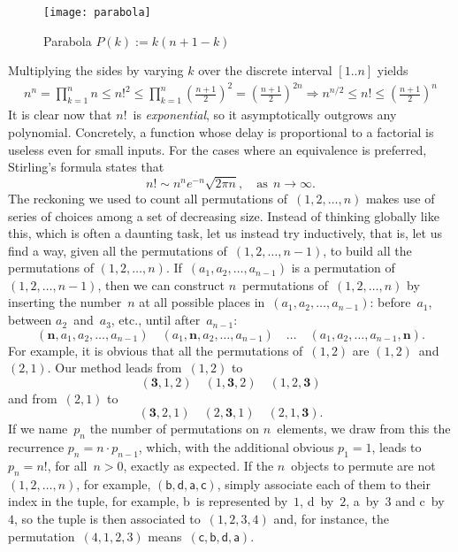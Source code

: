 \begin{figure}[H]
\centering
\texttt{[image: parabola]}
\caption{Parabola \(P(k) := k(n+1-k)\)\label{fig:parabola}}
\end{figure}
\noindent Multiplying the sides by varying \(k\) over the discrete
interval \([1..n]\) yields
\begin{gather*}
n^n = \prod_{k=1}^{n}{n} \leqslant n!^2 
\leqslant
\prod_{k=1}^{n}{\left(\!\frac{n+1}{2}\!\right)^2} \!\!=
\left(\!\frac{n+1}{2}\!\right)^{2n}
\!\!\!\Rightarrow\!
n^{n/2} \leqslant n! \leqslant \left(\!\frac{n+1}{2}\!\right)^n
\end{gather*}
It is clear now that \(n!\)~is \emph{exponential}, so it
asymptotically outgrows any polynomial. Concretely, a function whose
delay is proportional to a factorial is useless even for small
inputs. For the cases where an equivalence is preferred, Stirling's
formula states that
\begin{equation*}
n! \mathrel{\sim} n^n e^{-n} \sqrt{2\pi n},\quad \text{as} \,\; n
\rightarrow \infty.
\end{equation*}
The reckoning we used to count all permutations of~\((1,2,\dots,n)\)
makes use of series of choices among a set of decreasing size. Instead
of thinking globally like this, which is often a daunting task, let us
instead try inductively, that is, let us find a way, given all the
permutations of~\((1,2,\dots,n-1)\), to build all the permutations of
\((1,2,\dots,n)\). If~\((a_1,a_2,\dots,a_{n-1})\) is a permutation of
\((1,2,\dots,n-1)\), then we can construct \(n\)~permutations
of~\((1,2,\dots,n)\) by inserting the number~\(n\) at all possible
places in~\((a_1,a_2,\dots,a_{n-1})\): before~\(a_1\), between
\(a_2\)~and~\(a_3\), etc., until after~\(a_{n-1}\):
\[
(\boldsymbol{n},a_1,a_2,\dots,a_{n-1})\quad
(a_1,\boldsymbol{n},a_2,\dots,a_{n-1})\quad \ldots \quad
(a_1,a_2,\dots,a_{n-1},\boldsymbol{n}).
\]
For example, it is obvious that all the permutations of~\((1,2)\) are
\((1,2)\)~and~\((2,1)\). Our method leads from~\((1,2)\) to
\[
(\textbf{3},1,2) \quad (1,\textbf{3},2) \quad (1,2,\textbf{3})
\]
and from~\((2,1)\) to
\[
(\textbf{3},2,1) \quad (2,\textbf{3},1) \quad (2,1,\textbf{3}).
\]
If we name~\(p_n\) the number of permutations on \(n\)~elements, we
draw from this the recurrence \(p_n = n \cdot p_{n-1}\), which, with
the additional obvious \(p_1 = 1\), leads to~\(p_n = n!\), for all~\(n
> 0\), exactly as expected. If the \(n\)~objects to permute are
not~\((1,2,\dots,n)\), for example,
\((\textsf{b},\textsf{d},\textsf{a},\textsf{c})\), simply associate
each of them to their index in the tuple, for example, \textsf{b}~is
represented by~\(1\), \textsf{d}~by~\(2\), \textsf{a}~by~\(3\) and
\textsf{c}~by~\(4\), so the tuple is then associated to~\((1,2,3,4)\)
and, for instance, the permutation~\((4,1,2,3)\)
means~\((\textsf{c},\textsf{b},\textsf{d},\textsf{a})\).

